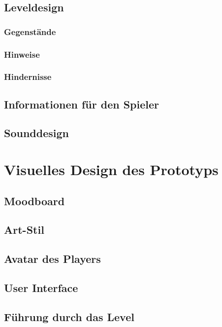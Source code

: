 \section{Leveldesign}

\subsection{Gegenstände}

\subsection{Hinweise}

\subsection{Hindernisse}

\section{Informationen für den Spieler}

\section{Sounddesign}

\chapter{Visuelles Design des Prototyps}

\section{Moodboard}

\section{Art-Stil}

\section{Avatar des Players}

\section{User Interface}

\section{Führung durch das Level}

